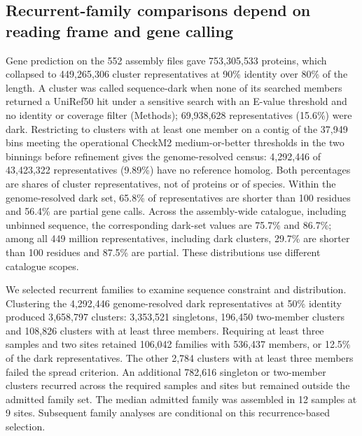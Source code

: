\documentclass[11pt]{article}
\begin{document}
\subsection*{Recurrent-family comparisons depend on reading frame and gene calling}

Gene prediction on the 552 assembly files gave 753{,}305{,}533 proteins, which collapsed to
449{,}265{,}306 cluster representatives at 90\% identity over 80\% of the length. A cluster was
called sequence-dark when none of its searched members returned a UniRef50 hit under a sensitive
search with an E-value threshold and no identity or coverage filter (Methods); 69{,}938{,}628
representatives (15.6\%) were dark. Restricting to clusters with at least one member on a contig of
the 37{,}949 bins meeting the operational CheckM2 medium-or-better thresholds in the two binnings before refinement gives the
genome-resolved census: 4{,}292{,}446 of 43{,}423{,}322 representatives (9.89\%) have no reference
homolog. Both percentages are shares of cluster representatives, not of
proteins or of species. Within the genome-resolved dark set, 65.8\% of representatives are
shorter than 100 residues and 56.4\% are partial gene calls. Across the assembly-wide catalogue,
including unbinned sequence, the corresponding dark-set values are 75.7\% and 86.7\%; among all
449 million representatives, including dark clusters, 29.7\% are shorter than 100 residues and
87.5\% are partial. These distributions use different catalogue scopes.

We selected recurrent families to examine sequence constraint and distribution. Clustering the
4{,}292{,}446 genome-resolved dark representatives at 50\% identity produced 3{,}658{,}797 clusters:
3{,}353{,}521 singletons, 196{,}450 two-member clusters and 108{,}826 clusters with at least three
members. Requiring at least three samples and two sites retained 106{,}042 families with 536{,}437
members, or 12.5\% of the dark representatives. The other 2{,}784 clusters with at least three
members failed the spread criterion. An additional 782{,}616 singleton or two-member clusters
recurred across the required samples and sites but remained outside the admitted family set.
The median admitted family was assembled in 12 samples at 9 sites. Subsequent family analyses
are conditional on this recurrence-based selection.
\end{document}
